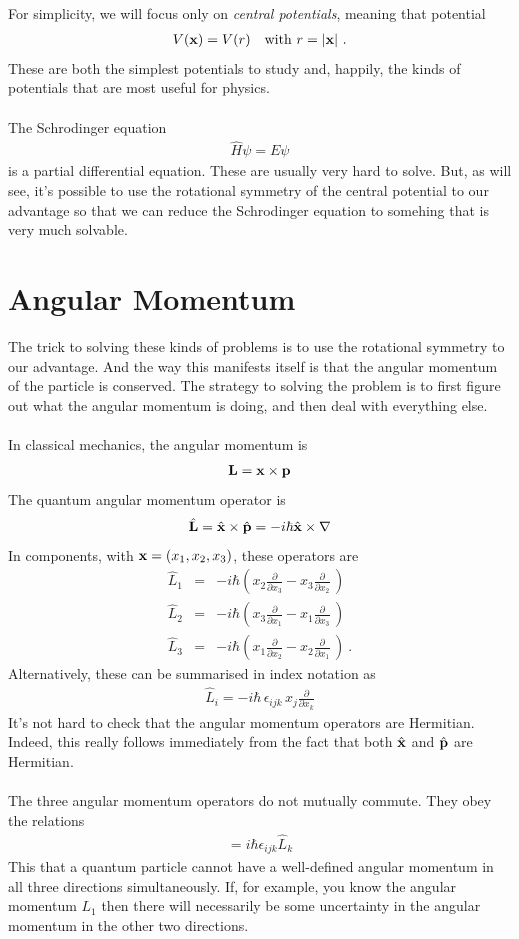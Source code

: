 \documentclass[12pt]{article}
\def\be{\begin{eqnarray}}
\def\ee{\end{eqnarray}}
\newcommand{\nn}{\nonumber}
\newcommand\para{\paragraph{}}
\newcommand{\ppp}[2]{\frac{\partial {#1}}{\partial {#2}}}
\newcommand{\co}{\color{olive}}
\newcommand{\bx}{{\bf x}}
\newcommand{\bp}{{\bf p}}
\begin{document}
{\para
{\co For simplicity, we will focus only on  {\it central potentials}, meaning that
potential
%
\be V(\bx) = V(r)\ \ \ {\rm with}\ r=|\bx|\ .\ee
%
These are both the simplest potentials to study and, happily, the kinds of potentials that are most useful for physics. }

\para
The Schrodinger equation 
%
\be\hat{H}\psi = E\psi\ee
%
is a partial differential equation. These are usually very hard to solve. But, as will see, it's possible to use the rotational symmetry of the central potential to our advantage so that we can reduce the Schrodinger equation to somehing that is very much solvable.





\section{Angular Momentum}

The trick to solving these kinds of problems is to use the rotational symmetry to our advantage. And the way this manifests itself is that the angular momentum of the particle is conserved. The strategy to solving the problem is to first figure out what the angular momentum is doing, and then deal with everything else.

\para
{\co In classical mechanics, the angular momentum is
%
\be {\bf L} = \bx\times \bp\nn\ee
%
The quantum angular momentum operator is
%
\be \hat{\bf L} = \hat{\bx} \times \hat{\bp} = -i\hbar \hat{\bx} \times \nabla\nn\ee
%
In components, with $\bx = (x_1,x_2,x_3)$, these operators are
%
\be \hat{L}_1 &=& -i\hbar\left(x_2\ppp{}{x_3} -x_3\ppp{}{x_2}\,\right)\ 
\nn\\  \hat{L}_2&=& -i\hbar\left(x_3\ppp{}{x_1} -x_1\ppp{}{x_3}\,\right) \ \\ 
 \hat{L}_3 &=& -i\hbar\left(x_1\ppp{}{x_2} -x_2\ppp{}{x_1}\,\right)\ .\nn\ee
%
Alternatively, these can be summarised in index notation as
%
\be \hat{L}_i = -i\hbar\,\epsilon_{ijk}\, x_j\ppp{}{x_k}\nn\ee
%
}
It's not hard to check that the angular momentum operators are Hermitian. Indeed, this really follows immediately from the fact that both $\hat{\bx}$ and $\hat{\bp}$ are Hermitian.


\para
{\co The three angular momentum operators do not mutually commute. They obey the relations
%
\be  [\hat{L}_i,\hat{L}_j] = i\hbar \epsilon_{ijk} \hat{L}_k\nn\ee
%
This  that a quantum particle cannot have a well-defined angular momentum in all three directions simultaneously. } If, for example, you know the angular momentum $L_1$ then there will necessarily be some uncertainty in the angular momentum in the other two directions.

}
\end{document}

